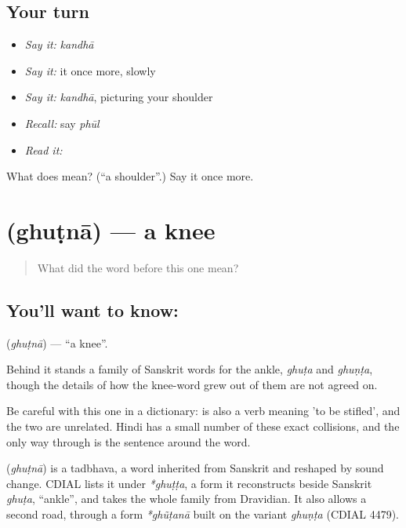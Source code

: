 \subsection*{Your turn}
\begin{itemize}
\raggedright
  \item \emph{Say it:} \emph{kandhā}
  \item \emph{Say it:} it once more, slowly
  \item \emph{Say it:} \emph{kandhā}, picturing your shoulder
  \item \emph{Recall:} say \emph{phūl}
  \item \emph{Read it:} \textbf{}
\end{itemize}

\begin{tcolorbox}[breakable,colback=teal!4,colframe=teal!35!black,title={Before you move on}]
What does  mean? (\textquotedblleft{}a shoulder\textquotedblright{}.) Say it once more.
\end{tcolorbox}
\section[\texorpdfstring{\hi{घुटना} (ghuṭnā)}{घुटना (ghuṭnā)}]{ (ghuṭnā) — a knee}

\label{lesson:HI-C53-knee}



\begin{quote}
What did the word before this one mean?
\end{quote}

\subsection*{You'll want to know: }
\textbf{} (\emph{ghuṭnā}) — \textquotedblleft{}a knee\textquotedblright{}.

Behind it stands a family of Sanskrit words for the ankle, \emph{ghuṭa} and \emph{ghuṇṭa}, though the details of how the knee-word grew out of them are not agreed on.

Be careful with this one in a dictionary:  is also a verb meaning 'to be stifled', and the two are unrelated. Hindi has a small number of these exact collisions, and the only way through is the sentence around the word.

\begin{cousinweb}
\textbf{} (\emph{ghuṭnā}) is a tadbhava, a word inherited from Sanskrit and reshaped by sound change. CDIAL lists it under \emph{*ghuṭṭa}, a form it reconstructs beside Sanskrit \emph{ghuṭa}, \textquotedblleft{}ankle\textquotedblright{}, and takes the whole family from Dravidian. It also allows a second road, through a form \emph{*ghũṭanā} built on the variant \emph{ghuṇṭa} (CDIAL 4479).
\end{cousinweb}

